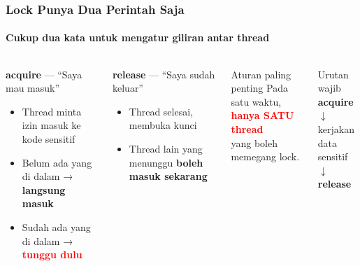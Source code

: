 \documentclass[t,aspectratio=169,xcolor=dvipsnames]{beamer}
\newcommand{\tem}[1]{\textbf{\textcolor{red}{#1}}}
\begin{document}
\begin{frame}
    \frametitle{Lock Punya Dua Perintah Saja}
    \framesubtitle{Cukup dua kata untuk mengatur giliran antar thread}
    \footnotesize

    \begin{columns}[T]
        \begin{block}{\textbf{acquire} — ``Saya mau masuk''}
            \begin{itemize}
                \item Thread minta izin masuk ke kode sensitif
                \item Belum ada yang di dalam → \textbf{langsung masuk}
                \item Sudah ada yang di dalam → \tem{tunggu dulu}
            \end{itemize}
        \end{block}

        \begin{block}{\textbf{release} — ``Saya sudah keluar''}
            \begin{itemize}
                \item Thread selesai, membuka kunci
                \item Thread lain yang menunggu \textbf{boleh masuk sekarang}
            \end{itemize}
        \end{block}

        \begin{exampleblock}{Aturan paling penting}
            \centering
            Pada satu waktu,\\
            \tem{hanya SATU thread}\\
            yang boleh memegang lock.
        \end{exampleblock}

        \begin{alertblock}{Urutan wajib}
            \centering
            \textbf{acquire}\\
            $\downarrow$\\
            kerjakan data sensitif\\
            $\downarrow$\\
            \textbf{release}
        \end{alertblock}
    \end{columns}
\end{frame}
\end{document}
